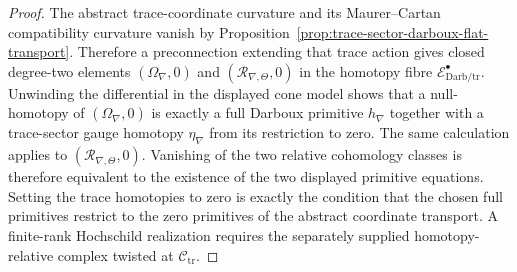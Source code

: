 \begin{proof}
The abstract trace-coordinate curvature and its Maurer--Cartan
compatibility curvature vanish by
Proposition~\ref{prop:trace-sector-darboux-flat-transport}.  Therefore a
preconnection extending that trace action gives closed degree-two
elements \((\Omega_\nabla,0)\) and
\((\mathcal R_{\nabla,\Theta},0)\) in the homotopy fibre
\(\mathcal E^\bullet_{\mathrm{Darb}/\mathrm{tr}}\).  Unwinding the
differential in the displayed cone model shows that a null-homotopy of
\((\Omega_\nabla,0)\) is exactly a full Darboux primitive
\(h_\nabla\) together with a trace-sector gauge homotopy
\(\eta_\nabla\) from its restriction to zero.  The same calculation
applies to \((\mathcal R_{\nabla,\Theta},0)\).  Vanishing of the two
relative cohomology classes is therefore equivalent to the existence of
the two displayed primitive equations.  Setting the trace homotopies to
zero is exactly the condition that the chosen full primitives restrict
to the zero primitives of the abstract coordinate transport.  A
finite-rank Hochschild realization requires the separately supplied
homotopy-relative complex twisted at \(\mathcal C_{\mathrm{tr}}\).
\end{proof}

